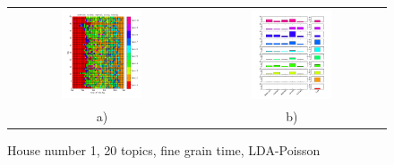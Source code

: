 \begin{figure}[h!]
 \centering
 \begin{tabular}{c c}
  \includegraphics[width=0.45\textwidth]{Pictures/Pois/fine/DayHN1TS48k20fine.png}
  &
  \includegraphics[width=0.45\textwidth]{Pictures/Pois/fine/TopHN1TS48k20fine.png}\\
  a) & b)
 \end{tabular}
  \caption{House number 1, 20 topics, fine grain time, LDA-Poisson}
\end{figure}


